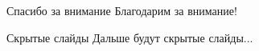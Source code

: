 \begin{frame}{Спасибо за внимание}
	Благодарим за внимание!
\end{frame}

\appendix

\begin{frame}{Скрытые слайды}
	Дальше будут скрытые слайды...
\end{frame}

%
%
%
%

%
%
%
%
%
%
%
%
%
%
%
%
%
%
%

